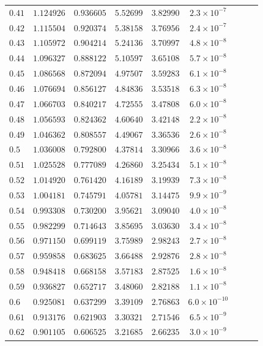 \documentclass[12pt]{extarticle}
\theoremstyle{plain}
\theoremstyle{remark}
\begin{document}
\begin{longtable}{lcccccccc}
$0.41$ & $1.124926$ & $0.936605$ & $5.52699$ & $3.82990$ & $2.3\times10^{-7}$ \\
$0.42$ & $1.115504$ & $0.920374$ & $5.38158$ & $3.76956$ & $2.4\times10^{-7}$ \\
$0.43$ & $1.105972$ & $0.904214$ & $5.24136$ & $3.70997$ & $4.8\times10^{-8}$ \\
$0.44$ & $1.096327$ & $0.888122$ & $5.10597$ & $3.65108$ & $5.7\times10^{-8}$ \\
$0.45$ & $1.086568$ & $0.872094$ & $4.97507$ & $3.59283$ & $6.1\times10^{-8}$ \\
$0.46$ & $1.076694$ & $0.856127$ & $4.84836$ & $3.53518$ & $6.3\times10^{-8}$ \\
$0.47$ & $1.066703$ & $0.840217$ & $4.72555$ & $3.47808$ & $6.0\times10^{-8}$ \\
$0.48$ & $1.056593$ & $0.824362$ & $4.60640$ & $3.42148$ & $2.2\times10^{-8}$ \\
$0.49$ & $1.046362$ & $0.808557$ & $4.49067$ & $3.36536$ & $2.6\times10^{-8}$ \\
$0.5$ & $1.036008$ & $0.792800$ & $4.37814$ & $3.30966$ & $3.6\times10^{-8}$ \\
$0.51$ & $1.025528$ & $0.777089$ & $4.26860$ & $3.25434$ & $5.1\times10^{-8}$ \\
$0.52$ & $1.014920$ & $0.761420$ & $4.16189$ & $3.19939$ & $7.3\times10^{-8}$ \\
$0.53$ & $1.004181$ & $0.745791$ & $4.05781$ & $3.14475$ & $9.9\times10^{-9}$ \\
$0.54$ & $0.993308$ & $0.730200$ & $3.95621$ & $3.09040$ & $4.0\times10^{-8}$ \\
$0.55$ & $0.982299$ & $0.714643$ & $3.85695$ & $3.03630$ & $3.4\times10^{-8}$ \\
$0.56$ & $0.971150$ & $0.699119$ & $3.75989$ & $2.98243$ & $2.7\times10^{-8}$ \\
$0.57$ & $0.959858$ & $0.683625$ & $3.66488$ & $2.92876$ & $2.8\times10^{-8}$ \\
$0.58$ & $0.948418$ & $0.668158$ & $3.57183$ & $2.87525$ & $1.6\times10^{-8}$ \\
$0.59$ & $0.936827$ & $0.652717$ & $3.48060$ & $2.82188$ & $1.1\times10^{-8}$ \\
$0.6$ & $0.925081$ & $0.637299$ & $3.39109$ & $2.76863$ & $6.0\times10^{-10}$ \\
$0.61$ & $0.913176$ & $0.621903$ & $3.30321$ & $2.71546$ & $6.5\times10^{-9}$ \\
$0.62$ & $0.901105$ & $0.606525$ & $3.21685$ & $2.66235$ & $3.0\times10^{-9}$ \\

\end{longtable}
\end{document}
